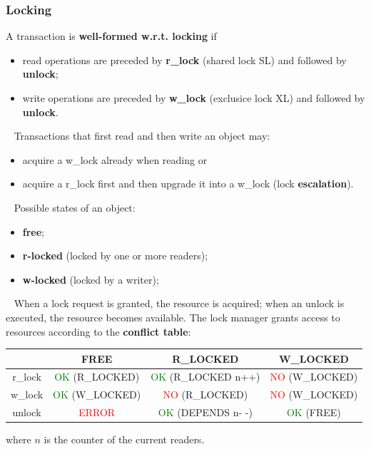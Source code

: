 \subsubsection{Locking}
A transaction is \textbf{well-formed w.r.t. locking} if
\begin{itemize}
    \item read operations are preceded by \textbf{r\_lock} (shared lock SL) and followed by \textbf{unlock};
    \item write operations are preceded by \textbf{w\_lock} (exclusice lock XL) and followed by \textbf{unlock}.
\end{itemize}
\ \newline
Transactions that first read and then write an object may:
\begin{itemize}
    \item acquire a w\_lock already when reading or
    \item acquire a r\_lock first and then upgrade it into a w\_lock (lock \textbf{escalation}).
\end{itemize}
\ \newline
Possible states of an object:
\begin{itemize}
    \item \textbf{free};
    \item \textbf{r-locked} (locked by one or more readers);
    \item \textbf{w-locked} (locked by a writer);
\end{itemize}
\ \newline
When a lock request is granted, the resource is acquired; when an unlock is executed, the resource becomes available.\newline
The lock manager grants access to resources according to the \textbf{conflict table}:
\renewcommand{\arraystretch}{1.5}
\begin{center}
    \begin{tabular}{ |c|c c c| } 
     \hline
     & FREE & R\_LOCKED & W\_LOCKED \\ 
     \hline
     r\_lock & \textcolor{green}{OK} (R\_LOCKED) & \textcolor{green}{OK} (R\_LOCKED n++) & \textcolor{red}{NO} (W\_LOCKED) \\ 
     w\_lock & \textcolor{green}{OK} (W\_LOCKED) & \textcolor{red}{NO} (R\_LOCKED) & \textcolor{red}{NO} (W\_LOCKED)\\ 
     unlock & \textcolor{red}{ERROR} & \textcolor{green}{OK} (DEPENDS n- -) & \textcolor{green}{OK} (FREE) \\ 
     \hline
    \end{tabular}
\end{center}
\renewcommand{\arraystretch}{1}
where $n$ is the counter of the current readers.
